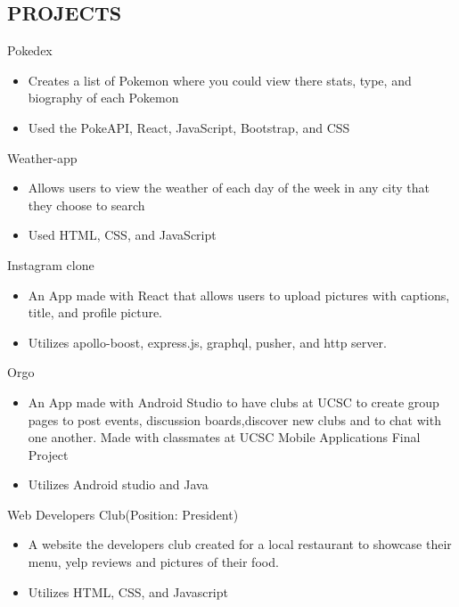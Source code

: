 \documentclass[margin]{res}
\begin{document}
\begin{resume}
\section{PROJECTS}     
	Pokedex
 		\begin{itemize} \itemsep -2pt 
 		\item Creates a list of Pokemon where you could view there stats, type, and biography of each Pokemon
 		\item Used the PokeAPI, React, JavaScript, Bootstrap, and CSS
 		\end{itemize}        
 	Weather-app
 		\begin{itemize} \itemsep -2pt 
 		\item Allows users to view the weather of each day of the week in any city that they choose to search
 		\item Used HTML, CSS, and JavaScript
 		\end{itemize}
 	Instagram\- clone
 		\begin{itemize} \itemsep -2pt 
 		\item An App made with React that allows users to upload pictures with captions, title, and profile picture. 
 		\item Utilizes apollo-boost, express.js, graphql, pusher, and http server.
 		
 		\end{itemize}
    Orgo
 		\begin{itemize} \itemsep -1pt 
 		\item An App made with Android Studio to have clubs at UCSC to create group pages to post events, discussion boards,discover new clubs and to chat with one another. Made with classmates at UCSC Mobile Applications Final Project
 		\item Utilizes Android studio and Java
 		
 		\end{itemize}
 	Web Developers Club(Position: President)
 		\begin{itemize} \itemsep -2pt 
 		\item A website the developers club created for a local restaurant to showcase their menu, yelp reviews and pictures of their food. 
 		\item Utilizes HTML, CSS, and Javascript
 		
 		\end{itemize}
 		

\end{resume}
\end{document}

